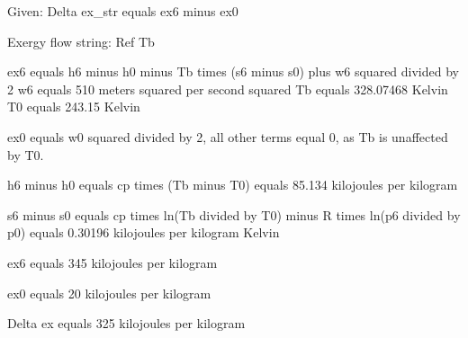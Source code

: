Given: Delta ex_str equals ex6 minus ex0  

Exergy flow string: Ref Tb  

ex6 equals h6 minus h0 minus Tb times (s6 minus s0) plus w6 squared divided by 2  
w6 equals 510 meters squared per second squared  
Tb equals 328.07468 Kelvin  
T0 equals 243.15 Kelvin  

ex0 equals w0 squared divided by 2, all other terms equal 0, as Tb is unaffected by T0.  

h6 minus h0 equals cp times (Tb minus T0) equals 85.134 kilojoules per kilogram  

s6 minus s0 equals cp times ln(Tb divided by T0) minus R times ln(p6 divided by p0)  
equals 0.30196 kilojoules per kilogram Kelvin  

ex6 equals 345 kilojoules per kilogram  

ex0 equals 20 kilojoules per kilogram  

Delta ex equals 325 kilojoules per kilogram